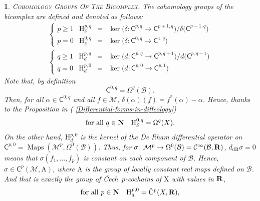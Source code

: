 \documentclass[12pt,reqno]{amsart}
\theoremstyle{article}
\newtheorem{article}{}
\def\artlabel[#1]{\textsc{#1}.}
\newcommand{\art}[1]{(\text{\textsection} \ref{#1})}
\def \A{\mathrm A}
\def \H{\mathrm H}
\def \X{\mathrm X}
\newcommand{\NN}{{\bf N}}
\newcommand{\RR}{{\bf R}}
\newcommand{\cB}{{\mathcal B}}
\newcommand{\cM}{\mathcal{M}}
\newcommand{\sC}{\mathsf{C}}
\newcommand{\Cinfty}{{\mathcal C}^{\infty}}
\newcommand{\Cech}{\v{C}ech\ }
\newcommand{\dR}{\mathrm{dR}}
\DeclareMathOperator{\Maps}{Maps}
\newcommand{\vC}{\check{\mathrm{C}}}
\def \H{\mathrm H}
\begin{document}
  
  \begin{article}\artlabel[Cohomology Groups Of The Bicomplex]
    \label{Cohomology-Groups-Of-The-Bicomplex}
    The cohomology groups of the bicomplex are defined and denoted as follows:
    \begin{equation*}
      \begin{array}{l}
        \left\{\begin{array}{llcl}
          p \geq 1 & \H^{p,q}_{\delta} & = & \ker\big(\delta : \sC^{p,q}\rightarrow \sC^{p+1,q}\big) / \delta \big(\sC^{p-1,q}\big) \\[.3ex]
          p=0 &  \H^{0,q}_{\delta} & = & \ker\big(\delta : \sC^{0,q}\rightarrow \sC^{1,q}\big)
        \end{array}\right. \\[3ex]
        \left\{\begin{array}{llcl}
          q\geq 1 & \H^{p,q}_d & = & \ker\big(d : \sC^{p,q}\rightarrow \sC^{p,q+1} \big) / d \big(\sC^{p,q-1}\big) \\[.3ex]
          q=0 &  \H^{p,0}_d & = & \ker\big(d : \sC^{p,0}\rightarrow \sC^{p,1}\big)
        \end{array}\right .
      \end{array}
    \end{equation*}
    Note that,
    by definition
    $$
    \sC^{0,q}=\Omega^q(\cB).
    $$
    Then,
    for all $\alpha \in \sC^{0,q}$ and all $f \in \cM$,
    $\delta(\alpha)(f) = f^*(\alpha) - \alpha$.
    Hence,
    thanks to the Proposition in \art{Differential-forms-in-diffeology}
    \begin{equation*}
      \text{for all } q\in \NN \quad \H^{0,q}_\delta =\Omega^q(X).
    \end{equation*}
    On the other hand,
    $\H^{p,0}_d$ is the kernel of the De Rham differential operator on $\sC^{p,0} = \Maps(\cM^p, \Omega^0(\cB))$.
    Thus,
    for $\sigma \colon \cM^p \to \Omega^0(\cB) = \Cinfty(\cB, \RR)$,
    $d_\dR\sigma = 0$ means that $\sigma(f_1,\dots,f_p)$ is constant on each component of $\cB$.
    Hence,
    $\sigma \in \sC^p(\cM, \A)$,
    where $\A$ is the group of locally constant real maps defined on $\cB$.
    And that is exactly the group of \Cech $p$-cochains of $\X$ with values in $\RR$,
    \begin{equation*}
      \text{for all } p\in \NN\quad \H^{p,0}_d = \vC^p(X,\RR),
    \end{equation*}
  \end{article}
  
\end{document}
